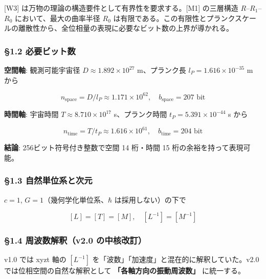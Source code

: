 \documentclass[a4paper,11pt]{ltjsarticle}
\begin{document}
{[}W3{]} は万物の理論の構造要件として有界性を要求する。{[}M1{]}
の三層構造 \(R\)--\(R_1\)--\(R_0\) において、最大の曲率半径 \(R_0\)
は有限である。この有限性とプランクスケールの離散性から、全位相量の表現に必要なビット数の上界が導かれる。

\subsubsection{§1.2
必要ビット数}\label{ux5fc5ux8981ux30d3ux30c3ux30c8ux6570}

\textbf{空間軸}: 観測可能宇宙径 \(D \approx 1.892 \times 10^{27}\)
m、プランク長 \(l_P = 1.616 \times 10^{-35}\) m から

\[n_{\text{space}} = D / l_P \approx 1.171 \times 10^{62}, \quad b_{\text{space}} = 207 \text{ bit}\]

\textbf{時間軸}: 宇宙時間 \(T \approx 8.710 \times 10^{17}\)
s、プランク時間 \(t_P = 5.391 \times 10^{-44}\) s から

\[n_{\text{time}} = T / t_P \approx 1.616 \times 10^{61}, \quad b_{\text{time}} = 204 \text{ bit}\]

\textbf{結論}: 256ビット符号付き整数で空間 14 桁・時間 15
桁の余裕を持って表現可能。

\subsubsection{§1.3
自然単位系と次元}\label{ux81eaux7136ux5358ux4f4dux7cfbux3068ux6b21ux5143}

\(c = 1\), \(G = 1\)（幾何学化単位系、\(\hbar\) は採用しない）の下で

\[[L] = [T] = [M], \quad [L^{-1}] = [M^{-1}]\]

\subsubsection{§1.4 周波数解釈（v2.0
の中核改訂）}\label{ux5468ux6ce2ux6570ux89e3ux91c8v2.0-ux306eux4e2dux6838ux6539ux8a02}

v1.0 では xyzt 軸の \([L^{-1}]\)
を「波数」「加速度」と混在的に解釈していた。v2.0
では位相空間の自然な解釈として \textbf{「各軸方向の振動周波数」}
に統一する。
\end{document}
